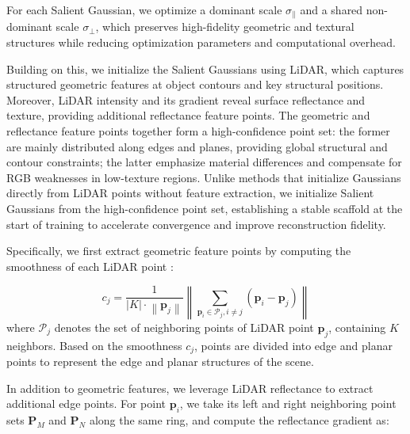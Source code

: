 \documentclass[letterpaper, 10 pt, conference]{ieeeconf}  %
\begin{document}
For each Salient Gaussian, we optimize a dominant scale $\sigma_{\|}$ and a shared non-dominant scale $\sigma_{\perp}$, which preserves high-fidelity geometric and textural structures while reducing optimization parameters and computational overhead. 

Building on this, we initialize the Salient Gaussians using LiDAR, which captures structured geometric features at object contours and key structural positions. Moreover, LiDAR intensity and its gradient reveal surface reflectance and texture, providing additional reflectance feature points. The geometric and reflectance feature points together form a high-confidence point set: the former are mainly distributed along edges and planes, providing global structural and contour constraints; the latter emphasize material differences and compensate for RGB weaknesses in low-texture regions. Unlike methods \cite{ref5,ref6} that initialize Gaussians directly from LiDAR points without feature extraction, we initialize Salient Gaussians from the high-confidence point set, establishing a stable scaffold at the start of training to accelerate convergence and improve reconstruction fidelity.

Specifically, we first extract geometric feature points by computing the smoothness of each LiDAR point \cite{ref32}:

\begin{equation}
	\label{eq7}
c_{j}=\frac{1}{|K| \cdot\left\|\mathbf{p}_{j}\right\|}\left\|\sum_{\mathbf{p}_{i} \in \mathcal{P}_{j}, i \neq j}\left(\mathbf{p}_{i}-\mathbf{p}_{j}\right)\right\|
\end{equation}
where $\mathcal{P}_{j}$ denotes the set of neighboring points of LiDAR point $\mathbf{p}_{j}$, containing $K$ neighbors. Based on the smoothness $c_j$, points are divided into edge and planar points to represent the edge and planar structures of the scene.

In addition to geometric features, we leverage LiDAR reflectance to extract additional edge points. For point $\mathbf{p}_{i}$, we take its left and right neighboring point sets ${\mathbf{P}}_M$ and ${\mathbf{P}}_N$ along the same ring, and compute the reflectance gradient as:
\end{document}
